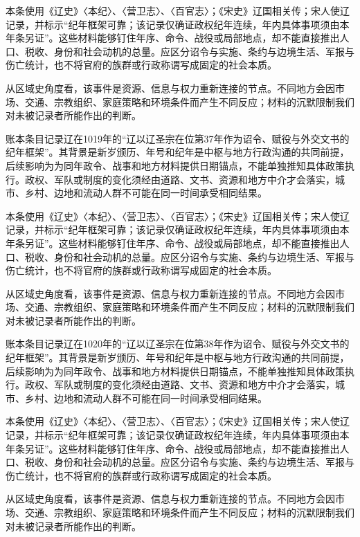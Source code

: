本条使用《辽史》〈本纪〉、〈营卫志〉、〈百官志〉；《宋史》辽国相关传；宋人使辽记录，并标示“纪年框架可靠；该记录仅确证政权纪年连续，年内具体事项须由本年条另证”。这些材料能够钉住年序、命令、战役或局部地点，却不能直接推出人口、税收、身份和社会动机的总量。应区分诏令与实施、条约与边境生活、军报与伤亡统计，也不将官府的族群或行政称谓写成固定的社会本质。

从区域史角度看，该事件是资源、信息与权力重新连接的节点。不同地方会因市场、交通、宗教组织、家庭策略和环境条件而产生不同反应；材料的沉默限制我们对未被记录者所能作出的判断。

账本条目记录辽在1019年的“辽以辽圣宗在位第37年作为诏令、赋役与外交文书的纪年框架”。其背景是新岁颁历、年号和纪年是中枢与地方行政沟通的共同前提，后续影响为为同年政令、战事和地方材料提供日期锚点，不能单独推知具体政策执行。政权、军队或制度的变化须经由道路、文书、资源和地方中介才会落实，城市、乡村、边地和流动人群不可能在同一时间承受相同结果。

本条使用《辽史》〈本纪〉、〈营卫志〉、〈百官志〉；《宋史》辽国相关传；宋人使辽记录，并标示“纪年框架可靠；该记录仅确证政权纪年连续，年内具体事项须由本年条另证”。这些材料能够钉住年序、命令、战役或局部地点，却不能直接推出人口、税收、身份和社会动机的总量。应区分诏令与实施、条约与边境生活、军报与伤亡统计，也不将官府的族群或行政称谓写成固定的社会本质。

从区域史角度看，该事件是资源、信息与权力重新连接的节点。不同地方会因市场、交通、宗教组织、家庭策略和环境条件而产生不同反应；材料的沉默限制我们对未被记录者所能作出的判断。

账本条目记录辽在1020年的“辽以辽圣宗在位第38年作为诏令、赋役与外交文书的纪年框架”。其背景是新岁颁历、年号和纪年是中枢与地方行政沟通的共同前提，后续影响为为同年政令、战事和地方材料提供日期锚点，不能单独推知具体政策执行。政权、军队或制度的变化须经由道路、文书、资源和地方中介才会落实，城市、乡村、边地和流动人群不可能在同一时间承受相同结果。

本条使用《辽史》〈本纪〉、〈营卫志〉、〈百官志〉；《宋史》辽国相关传；宋人使辽记录，并标示“纪年框架可靠；该记录仅确证政权纪年连续，年内具体事项须由本年条另证”。这些材料能够钉住年序、命令、战役或局部地点，却不能直接推出人口、税收、身份和社会动机的总量。应区分诏令与实施、条约与边境生活、军报与伤亡统计，也不将官府的族群或行政称谓写成固定的社会本质。

从区域史角度看，该事件是资源、信息与权力重新连接的节点。不同地方会因市场、交通、宗教组织、家庭策略和环境条件而产生不同反应；材料的沉默限制我们对未被记录者所能作出的判断。


